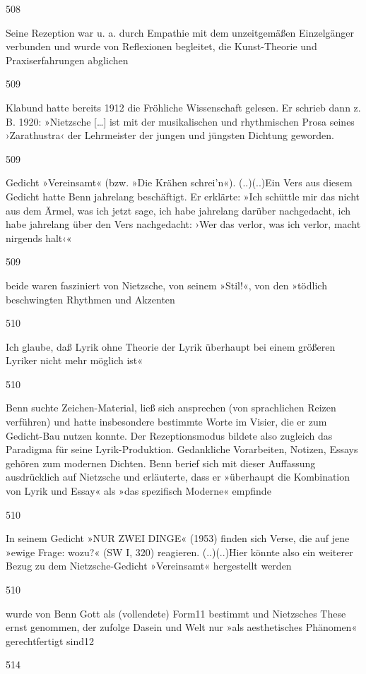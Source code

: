 \documentclass[
  letterpaper,
  DIV=11,
  numbers=noendperiod]{scrartcl}
\begin{document}
508

Seine Rezeption war u. a. durch Empathie mit dem unzeitgemäßen
Einzelgänger verbunden und wurde von Reflexionen begleitet, die
Kunst-Theorie und Praxiserfahrungen abglichen

509

Klabund hatte bereits 1912 die Fröhliche Wissenschaft gelesen. Er
schrieb dann z. B. 1920: »Nietzsche {[}\ldots{]} ist mit der
musikalischen und rhythmischen Prosa seines ›Zarathustra‹ der
Lehrmeister der jungen und jüngsten Dichtung geworden.

509

Gedicht »Vereinsamt« (bzw. »Die Krähen schrei'n«). (..)(..)Ein Vers aus
diesem Gedicht hatte Benn jahrelang beschäftigt. Er erklärte: »Ich
schüttle mir das nicht aus dem Ärmel, was ich jetzt sage, ich habe
jahrelang darüber nachgedacht, ich habe jahrelang über den Vers
nachgedacht: ›Wer das verlor, was ich verlor, macht nirgends halt‹«

509

beide waren fasziniert von Nietzsche, von seinem »Stil!«, von den
»tödlich beschwingten Rhythmen und Akzenten

510

Ich glaube, daß Lyrik ohne Theorie der Lyrik überhaupt bei einem
größeren Lyriker nicht mehr möglich ist«

510

Benn suchte Zeichen-Material, ließ sich ansprechen (von sprachlichen
Reizen verführen) und hatte insbesondere bestimmte Worte im Visier, die
er zum Gedicht-Bau nutzen konnte. Der Rezeptionsmodus bildete also
zugleich das Paradigma für seine Lyrik-Produktion. Gedankliche
Vorarbeiten, Notizen, Essays gehören zum modernen Dichten. Benn berief
sich mit dieser Auffassung ausdrücklich auf Nietzsche und erläuterte,
dass er »überhaupt die Kombination von Lyrik und Essay« als »das
spezifisch Moderne« empfinde

510

In seinem Gedicht »NUR ZWEI DINGE« (1953) finden sich Verse, die auf
jene »ewige Frage: wozu?« (SW I, 320) reagieren. (..)(..)Hier könnte
also ein weiterer Bezug zu dem Nietzsche-Gedicht »Vereinsamt«
hergestellt werden

510

wurde von Benn Gott als (vollendete) Form11 bestimmt und Nietzsches
These ernst genommen, der zufolge Dasein und Welt nur »als aesthetisches
Phänomen« gerechtfertigt sind12

514
\end{document}
